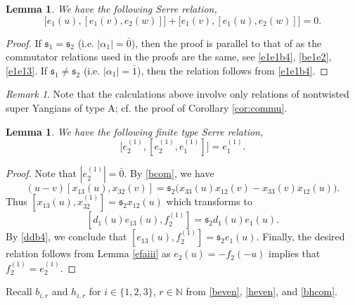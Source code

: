\documentclass[11pt,reqno]{amsart}
\numberwithin{equation}{section}
\newtheorem{lem}[thm]{Lemma}
\theoremstyle{definition}
\theoremstyle{remark}
\newtheorem{rem}[thm]{Remark}
\newcommand{\bN}{\mathbb{N}}
\newcommand{\ka}{{\mathfrak s}}
\begin{document}
\begin{lem}\label{sec:A-serre}
We have the following Serre relation,
\[
\big[e_1(u),[e_1(v),e_2(w)]\big]+\big[e_1(v),[e_1(u),e_2(w)]\big]=0.
\]
\end{lem}
\begin{proof}
If $\ka_1=\ka_2$ (i.e. $|\alpha_1|=\bar 0$), then the proof is parallel to that of \cite[Lemma 6.3]{Peng2016parabolic} as the commutator relations used in the proofs are the same, see \eqref{e1e1b4}, \eqref{be1e2}, \eqref{e1e13}. If $\ka_1\ne \ka_2$ (i.e. $|\alpha_1|=\bar 1$), then the  relation follows from \eqref{e1e1b4}.
\end{proof}

\begin{rem}
Note that the calculations above involve only relations of nontwisted super Yangians of type A; cf. the proof of Corollary \ref{cor:commu}.
\end{rem}

\begin{lem}\label{x4serre0}
We have the following finite type Serre relation,
\[
\big[e_2^{(1)},[e_2^{(1)},e_1^{(1)}]\big]=e_1^{(1)}.
\]
\end{lem}
\begin{proof}
Note that $|e_2^{(1)}|=\bar 0$. By \eqref{bcom}, we have
\[
(u-v)[x_{13}(u),x_{32}(v)]=\ka_2\big(x_{33}(u)x_{12}(v)-x_{33}(v)x_{12}(u)\big).
\]
Thus $[x_{13}(u),x_{32}^{(1)}]=\ka_2 x_{12}(u)$ which transforms to
\[
[d_1(u)e_{13}(u),f_2^{(1)}]=\ka_2d_1(u)e_1(u).
\]
By \eqref{ddb4}, we conclude that $[e_{13}(u),f_2^{(1)}]=\ka_2e_1(u)$. Finally, the desired relation follows from Lemma \ref{efaiii} as $e_2(u)=-f_2(-u)$ implies that $f_2^{(1)}=e_2^{(1)}$.
\end{proof}

Recall $b_{i,r}$ and $h_{i,r}$ for $i\in\{1,2,3\}$,  $r\in\bN$ from \eqref{beven}, \eqref{heven}, and \eqref{bhcom}.
\end{document}
